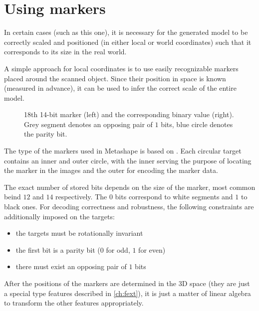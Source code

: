 \section{Using markers}
In certain cases (such as this one), it is necessary for the generated model to be correctly scaled and positioned (in either local or world coordinates) such that it corresponds to its size in the real world.

A simple approach for local coordinates is to use easily recognizable markers placed around the scanned object.
Since their position in space is known (measured in advance), it can be used to infer the correct scale of the entire model.

\begin{figure}
	\centering
	
	\caption{18th 14-bit marker (left) and the corresponding binary value (right). Grey segment denotes an opposing pair of $1$ bits, blue circle denotes the parity bit.}
\end{figure}

The type of the markers used in Metashape is based on \citet{schneider19913,borisPatent}.
Each circular target contains an inner and outer circle, with the inner serving the purpose of locating the marker in the images and the outer for encoding the marker data.

The exact number of stored bits depends on the size of the marker, most common beind $12$ and $14$ respectively.
The $0$ bits correspond to white segments and $1$ to black ones.
For decoding correctness and robustness, the following constraints are additionally imposed on the targets:

\begin{itemize}
	\item the targets must be rotationally invariant
	\item the first bit is a parity bit ($0$ for odd, $1$ for even)
	\item there must exist an opposing pair of $1$ bits
\end{itemize}

After the positions of the markers are determined in the 3D space (they are just a special type features described in \ref{ch:fext}), it is just a matter of linear algebra to transform the other features appropriately.
